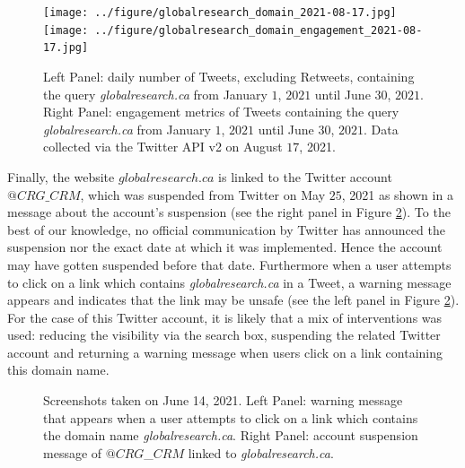 \documentclass{article}
\begin{document}
\begin{figure}[h]
\centering
\hspace{-2em}
		\texttt{[image: ../figure/globalresearch\_domain\_2021-08-17.jpg]} 
		\texttt{[image: ../figure/globalresearch\_domain\_engagement\_2021-08-17.jpg]}
\caption{Left Panel: daily number of Tweets, excluding Retweets, containing the query {\it globalresearch.ca} from January $1$, $2021$ until June $30$, $2021$. Right Panel: engagement metrics of Tweets containing the query {\it globalresearch.ca} from January $1$, $2021$ until June $30$, $2021$. Data collected via the Twitter API v2 on August $17$, 2021.   }
\label{fig4}
\end{figure}

Finally, the website $globalresearch.ca$ is linked to the Twitter account {$@CRG\_CRM$}, which was suspended from Twitter on May $25$, 2021 as shown in a message about the account's suspension (see the right panel in Figure \ref{fig4bis}). To the best of our knowledge, no official communication by Twitter has announced the suspension nor the exact date at which it was implemented. Hence the account may have gotten suspended before that date. Furthermore when a user attempts to click on a link which contains {\it globalresearch.ca} in a Tweet, a warning message appears and indicates that the link may be unsafe (see the left panel in Figure \ref{fig4bis}). For the case of this Twitter account, it is likely that a mix of interventions was used: reducing the visibility via the search box, suspending the related Twitter account and returning a warning message when users click on a link containing this domain name.  


\begin{figure}[h]
	\begin{center}
	\end{center}
	\caption{Screenshots taken on June 14, 2021. Left Panel: warning message that appears when a user attempts to click on a link which contains the domain name {\it globalresearch.ca}. Right Panel: account suspension message of $@CRG$\_$CRM$ linked to {\it globalresearch.ca}.  }
	\label{fig4bis}
\end{figure}

\end{document}

